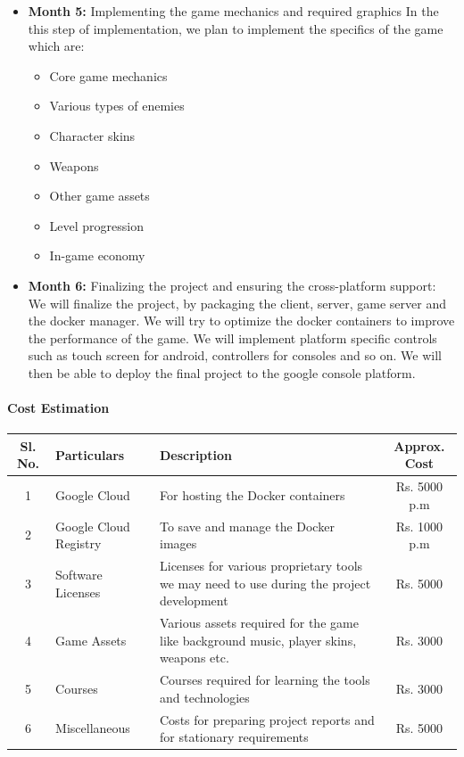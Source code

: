 \documentclass[oneside,12pt]{Classes/VTU}
\begin{document}
\begin{itemize}
		\item \textbf{Month 5: }Implementing the game mechanics and required graphics
		In the this step of implementation, we plan to implement the specifics of the game which are: 
		\begin{itemize}
			\item Core game mechanics
			\item Various types of enemies
			\item Character skins
			\item Weapons
			\item Other game assets
			\item Level progression
			\item In-game economy
		\end{itemize}
		
		\item \textbf{Month 6: }Finalizing the project and ensuring the cross-platform support: 
		We will finalize the project, by packaging the client, server, game server and the docker manager. We will try to optimize the docker containers to improve the performance of the game. We will implement platform specific controls such as touch screen for android, controllers for consoles and so on. We will then be able to deploy the final project to the google console platform.
		
			
	\end{itemize}
	
	\paragraph{\LARGE{Cost Estimation}}

	\begin{center}
		\begin{tabular}{ | c | m{2.5cm} | m{7cm} | c | }
			\hline 
			\textbf{Sl. No.} & \textbf{Particulars} & \textbf{Description} & \textbf{Approx. Cost} \\
			\hline \hline
			1 & Google Cloud & For hosting the Docker containers & Rs. 5000 p.m \\
			\hline
			2 & Google Cloud Registry & To save and manage the Docker images & Rs. 1000 p.m \\
			\hline
			3 & Software \newline Licenses & Licenses for various proprietary tools we may need to use during the project development & Rs. 5000 \\
			\hline
			4 & Game Assets & Various assets required for the game like background music, player skins, weapons etc. & Rs. 3000 \\
			\hline
			5 & Courses & Courses required for learning the tools and technologies & Rs. 3000 \\
			\hline
			6 & Miscellaneous & Costs for preparing project reports and for stationary requirements & Rs. 5000 \\
			\hline
		\end{tabular}
	\end{center}
	
\end{document}

